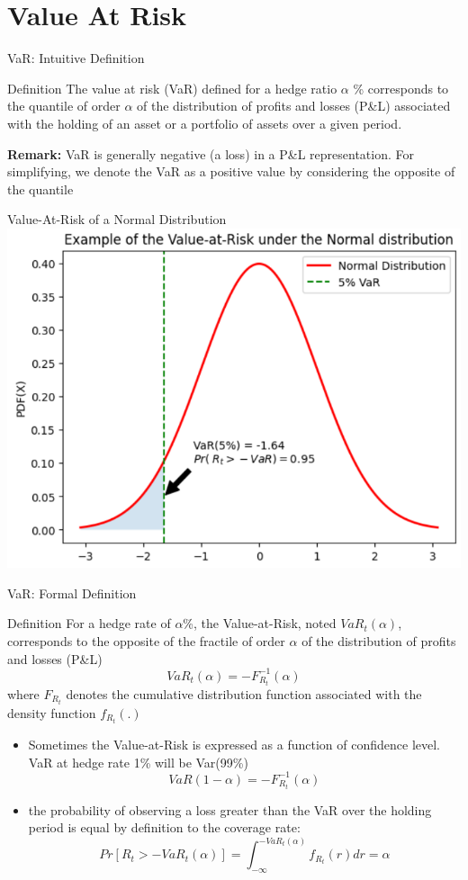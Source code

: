 \documentclass{beamer}
\newcommand{\imfbold}[1]{\textbf{\textcolor{imfblue}{#1}}}
\begin{document}
\section{Value At Risk}
\begin{frame}{VaR: Intuitive Definition}
\begin{block}{Definition}
The value at risk (VaR) defined for a hedge ratio $\alpha$ \% corresponds to the quantile of order $\alpha$ of the distribution of profits and losses (P\&L) associated with the holding of an asset or a portfolio of assets over a given period.
\end{block}    
\imfbold{Remark:} VaR is generally negative (a loss) in a P\&L representation. For simplifying, we denote the VaR as a positive value by considering the opposite of the quantile
\end{frame}

\begin{frame}{Value-At-Risk of a Normal Distribution}
    \centering
    \includegraphics[width = .8\textwidth] {static/course_3_img/VAR_normal.PNG}
\end{frame}

\begin{frame}{VaR: Formal Definition}
\small
\begin{block}{Definition}
    For a hedge rate of $\alpha$\%, the Value-at-Risk, noted $VaR_t (\alpha)$, corresponds to the opposite of the fractile of order $\alpha$ of the distribution of profits and losses (P\&L) 
    $$VaR_t(\alpha) = -F^{-1}_{R_t}(\alpha)$$
    where $F_{R_t}$ denotes the cumulative distribution function associated with the density function $f_{R_t}(.)$
\end{block}
\begin{itemize}
    \item Sometimes the Value-at-Risk is expressed as a function of confidence level. VaR at hedge rate 1\% will be Var(99\%)
    $$VaR(1-\alpha) = -F_{R_t}^{-1}(\alpha)$$
    \item the probability of observing a loss greater than the VaR over the holding period is equal by definition to the coverage rate:
    $$Pr[R_t>-VaR_t(\alpha)] = \int_{-\infty}^{-VaR_t(\alpha)}{f_{R_t}(r) dr} = \alpha $$
\end{itemize}
\end{frame}
\end{document}
